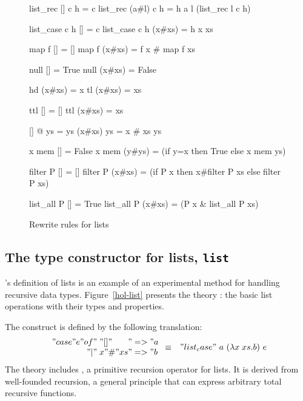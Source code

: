 \begin{figure}
\begin{ttbox}\makeatother
{}    list_rec [] c h = c  
   list_rec (a#l) c h = h a l (list_rec l c h)

   list_case c h [] = c 
  list_case c h (x#xs) = h x xs

         map f [] = []
        map f (x#xs) = f x # map f xs

        null [] = True
       null (x#xs) = False

         hd (x#xs) = x
         tl (x#xs) = xs

         ttl [] = []
        ttl (x#xs) = xs

      [] @ ys = ys
     (x#xs) \at ys = x # xs \at ys

         x mem [] = False
        x mem (y#ys) = (if y=x then True else x mem ys)

      filter P [] = []
     filter P (x#xs) = (if P x then x#filter P xs else filter P xs)

    list_all P [] = True
   list_all P (x#xs) = (P x & list_all P xs)
\end{ttbox}
\caption{Rewrite rules for lists} \label{hol-list-simps}
\end{figure}


\subsection{The type constructor for lists, {\tt list}}

\HOL's definition of lists is an example of an experimental method for
handling recursive data types.  Figure~\ref{hol-list} presents the theory
: the basic list operations with their types and properties.

The  construct is defined by the following translation:
{\dquotes
\begin{eqnarray*}
  \begin{array}{r@{\;}l@{}l}
  "case " e " of" & "[]"    & " => " a\\
              "|" & x"\#"xs & " => " b
  \end{array} 
  & \equiv &
  "list_case"~a~(\lambda x\;xs.b)~e
\end{eqnarray*}}%
The theory includes , a primitive recursion operator
for lists.  It is derived from well-founded recursion, a general principle
that can express arbitrary total recursive functions.

